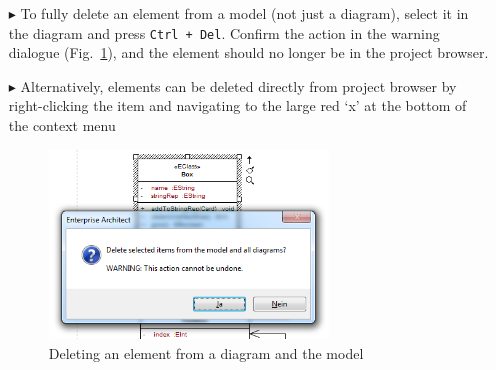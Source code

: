 \begin{itemize}
\item[$\blacktriangleright$] To fully delete an element from a model (not just a diagram), select it in the diagram and press \texttt{Ctrl + Del}. Confirm the
action in the warning dialogue (Fig.~\ref{ea:deleteWarning}), and the element should no longer be in the project browser.

\vspace{0.5cm}

\item[$\blacktriangleright$] Alternatively, elements can be deleted directly from project browser by right-clicking the item and navigating to the large
red `x' at the bottom of the context menu

\begin{figure}[htbp]
\begin{center}
  \includegraphics[width=0.7\textwidth]{ea_deleteWarning}
  \caption{Deleting an element from a diagram and the model}  
  \label{ea:deleteWarning}
\end{center}
\end{figure}  

\end{itemize}
